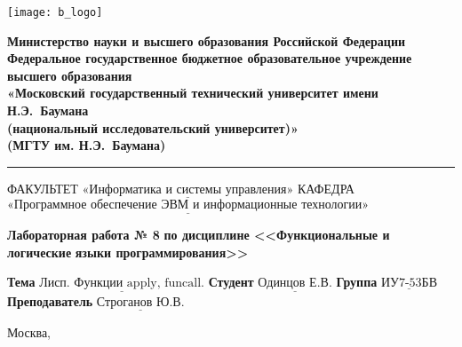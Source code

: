 \thispagestyle{empty}

\noindent \begin{minipage}{0.15\textwidth}
	\texttt{[image: b\_logo]}
\end{minipage}
\noindent\begin{minipage}{0.85\textwidth}\centering
	\textbf{Министерство науки и высшего образования Российской Федерации}\\
	\textbf{Федеральное государственное бюджетное образовательное учреждение высшего образования}\\
	\textbf{«Московский государственный технический университет имени Н.Э.~Баумана}\\
	\textbf{(национальный исследовательский университет)»}\\
	\textbf{(МГТУ им. Н.Э.~Баумана)}
\end{minipage}

\noindent\rule{\linewidth}{3pt}
\newline\newline
\noindent ФАКУЛЬТЕТ $\underline{\text{«Информатика и системы управления»}}$ \newline\newline
\noindent КАФЕДРА $\underline{\text{«Программное обеспечение ЭВМ и информационные технологии»}}$

\vspace{1cm}

\begin{center}
	\noindent\begin{minipage}{1.3\textwidth}\centering
		\Large\textbf{  Лабораторная работа № 8}\newline
		\textbf{по дисциплине <<Функциональные и логические}\newline
		\textbf{языки программирования>>}\newline\newline
	\end{minipage}
\end{center}

\noindent\textbf{Тема} $\underline{\text{Лисп. Функции apply, funcall.}}$\newline\newline
\noindent\textbf{Студент} $\underline{\text{Одинцов Е.В.}}$\newline\newline
\noindent\textbf{Группа} $\underline{\text{ИУ7-53БВ}}$\newline\newline
\noindent\textbf{Преподаватель} $\underline{\text{Строганов Ю.В.}}$\newline

\begin{center}
	\vfill
	Москва,~\the\year
\end{center}
\clearpage
